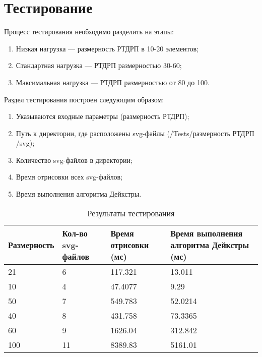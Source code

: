 \chapter{Тестирование}
\label{cha:ch_5}
Процесс тестирования необходимо разделить на этапы:
\begin{enumerate}
	\item Низкая нагрузка --- размерность РТДРП в 10-20 элементов;
	\item Стандартная нагрузка --- РТДРП размерностью 30-60;
	\item Максимальная нагрузка --- РТДРП размерностью от 80 до 100.
\end{enumerate}

Раздел тестирования построен следующим образом:
\begin{enumerate}
	\item Указываются входные параметры (размерность РТДРП);
	\item Путь к директории, где расположены svg-файлы (/Tests/$\textbf{размерность РТДРП}$/svg);
	\item Количество svg-файлов в директории;
	\item Время отрисовки всех svg-файлов;
	\item Время выполнения алгоритма Дейкстры.
\end{enumerate}

\begin{table}[]
\centering
\label{my-label}
\begin{tabular}{|l|l|l|l|}
\hline
\textbf{Размерность} & \multicolumn{1}{|p{3cm}|}{\textbf{Кол-во svg-файлов}} & \multicolumn{1}{|p{3cm}|}{\textbf{Время отрисовки (мс)}} & \multicolumn{1}{|p{3cm}|}{\textbf{Время выполнения алгоритма Дейкстры (мс)}} \\ \hline
21                   & 6                          & 117.321                       & 13.011                                            \\ \hline
10                   & 4                          & 47.4077                       & 9.29                                              \\ \hline
50                   & 7                          & 549.783                       & 52.0214                                           \\ \hline
40                   & 8                          & 431.758                       & 73.3365                                           \\ \hline
60                   & 9                          & 1626.04                       & 312.842                                           \\ \hline
100                  & 11                         & 8389.83                       & 5161.01                                           \\ \hline
\end{tabular}
\caption{Результаты тестирования}
\end{table}